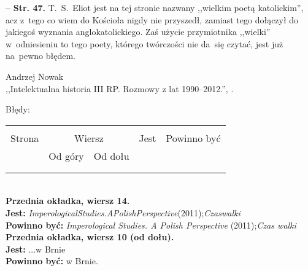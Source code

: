 \documentclass[a4paper,11pt]{article}
\newcommand{\tb}{\textbf}
\newcommand{\Str}[1]{\textbf{Str. #1.}}
\newcommand{\noi}{\noindent}
\newcommand{\start}{\noi \tb{--} {}}
\newcommand{\Jest}{\textbf{Jest: }}
\newcommand{\Pow}{\textbf{Powinno być: }}
\begin{document}
\start \Str{47} T.~S.~Eliot jest na tej stronie nazwany ,,wielkim
poetą katolickim'', acz z~tego co wiem do Kościoła nigdy nie
przyszedł, zamiast tego dołączył do jakiegoś wyznania
anglokatolickiego. Zaś użycie przymiotnika ,,wielki'' w~odniesieniu to
tego poety, którego twórczości nie da~się czytać, jest już na~pewno
błędem.




\begin{center}
  Andrzej Nowak \\
  ,,Intelektualna historia III RP. Rozmowy z lat 1990--2012.'',
  \cite{Now13}.
\end{center}

Błędy:\\
\begin{center}
  \begin{tabular}{|c|c|c|c|c|}
    \hline
    & \multicolumn{2}{c|}{} & & \\
    Strona & \multicolumn{2}{c|}{Wiersz}& Jest & Powinno być \\ \cline{2-3}
    & Od góry & Od dołu &  &  \\ \hline
    & & & & \\
    & & & & \\ \hline
  \end{tabular}
\end{center}
\noindent\\
\tb{Przednia okładka, wiersz 14.}\\
\Jest \emph{ImperologicalStudies.APolishPerspective}(2011);\emph{Czaswalki} \\
\Pow \emph{Imperological Studies. A Polish Perspective} (2011);\emph{Czas walki} \\
\tb{Przednia okładka, wiersz 10 (od dołu).}\\
\Jest ...w Brnie \\
\Pow w Brnie. \\
\end{document}
